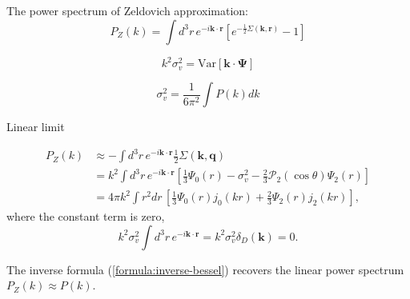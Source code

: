 \documentclass[a4paper,11pt]{article}
\begin{document}
The power spectrum of Zeldovich approximation:
\begin{equation}
  P_Z(k) = \int \! d^3 r \, e^{-i\bm{k}\cdot\bm{r}}
                          \left[ e^{-\frac{1}{2} \Sigma(\bm{k}, \bm{r})} - 1 \right]
\end{equation}


\begin{equation}
  k^2 \sigma_v^2 = \textrm{Var}\left[ \bm{k}\cdot\bm{\Psi} \right]
\end{equation}

\begin{equation}
  \sigma_v^2 = \frac{1}{6\pi^2}\int \! P(k) dk
\end{equation}

Linear limit

\begin{align}
  P_Z(k) &\approx - \int \! d^3 r \, e^{-i\bm{k}\cdot\bm{r}}
           \frac{1}{2}\Sigma(\bm{k}, \bm{q})\\
           &= k^2 \int\!d^3 r \, e^{-i\bm{k}\cdot\bm{r}}
               \left[ \frac{1}{3} \Psi_0(r) - \sigma_v^2
                 - \frac{2}{3} \mathcal{P}_2(\cos\theta) \Psi_2(r) \right]\\
               &= 4\pi k^2 \int\! r^2 d r \,
               \left[ \frac{1}{3} \Psi_0(r) j_0(kr)
                      + \frac{2}{3} \Psi_2(r) j_2(kr) \right],
\end{align}
where the constant term is zero,
\begin{equation}
  k^2 \sigma_v^2 \int \! d^3 r \, e^{-i\bm{k}\cdot\bm{r}} 
  =  k^2 \sigma_v^2 \delta_D(\bm{k}) = 0.
\end{equation}

The inverse formula (\ref{formula:inverse-bessel}) recovers the linear
power spectrum $P_Z(k) \approx P(k)$.

  

\label{LastPage}
\end{document}
